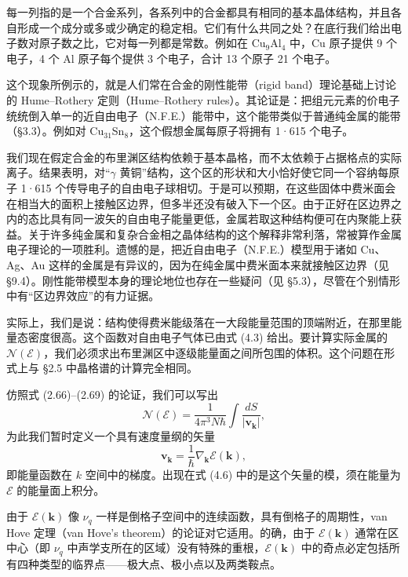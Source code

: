 每一列指的是一个合金系列，各系列中的合金都具有相同的基本晶体结构，并且各自形成一个成分或多或少确定的稳定相。它们有什么共同之处？在底行我们给出电子数对原子数之比，它对每一列都是常数。例如在 Cu$_9$Al$_4$ 中，Cu 原子提供 9 个电子，4 个 Al 原子每个提供 3 个电子，合计 13 个原子 21 个电子。

这个现象所例示的，就是人们常在合金的刚性能带（rigid band）理论基础上讨论的 Hume–Rothery 定则（Hume–Rothery rules）。其论证是：把组元元素的价电子统统倒入单一的近自由电子（N.F.E.）能带中，这个能带类似于普通纯金属的能带（§3.3）。例如对 Cu$_{31}$Sn$_{8}$，这个假想金属每原子将拥有 1·615 个电子。

我们现在假定合金的布里渊区结构依赖于基本晶格，而不太依赖于占据格点的实际离子。结果表明，对“$\gamma$ 黄铜”结构，这个区的形状和大小恰好使它同一个容纳每原子 1·615 个传导电子的自由电子球相切。于是可以预期，在这些固体中费米面会在相当大的面积上接触区边界，但多半还没有破入下一个区。由于正好在区边界之内的态比具有同一波矢的自由电子能量更低，金属若取这种结构便可在内聚能上获益。关于许多纯金属和复杂合金相之晶体结构的这个解释非常利落，常被算作金属电子理论的一项胜利。遗憾的是，把近自由电子（N.F.E.）模型用于诸如 Cu、Ag、Au 这样的金属是有异议的，因为在纯金属中费米面本来就接触区边界（见 §9.4）。刚性能带模型本身的理论地位也存在一些疑问（见 §5.3），尽管在个别情形中有“区边界效应”的有力证据。

实际上，我们是说：结构使得费米能级落在一大段能量范围的顶端附近，在那里能量态密度很高。这个函数对自由电子气体已由式 (4.3) 给出。要计算实际金属的 $\mathcal{N}(\mathcal{E})$，我们必须求出布里渊区中逐级能量面之间所包围的体积。这个问题在形式上与 §2.5 中晶格谱的计算完全相同。


仿照式 (2.66)–(2.69) 的论证，我们可以写出
\begin{equation*}
\mathcal{N}(\mathcal{E})=\frac{1}{4\pi^{3}N\hbar}\int\frac{dS}{|\mathbf{v}_{\mathbf{k}}|},
\tag{4.6}
\end{equation*}
为此我们暂时定义一个具有速度量纲的矢量
\begin{equation*}
\mathbf{v}_{\mathbf{k}}=\frac{1}{\hbar}\nabla_{\mathbf{k}}\mathcal{E}(\mathbf{k}),
\tag{4.7}
\end{equation*}
即能量函数在 $k$ 空间中的梯度。出现在式 (4.6) 中的是这个矢量的模，须在能量为 $\mathcal{E}$ 的能量面上积分。

由于 $\mathcal{E}(\mathbf{k})$ 像 $\nu_{q}$ 一样是倒格子空间中的连续函数，具有倒格子的周期性，van Hove 定理（van Hove's theorem）的论证对它适用。的确，由于 $\mathcal{E}(\mathbf{k})$ 通常在区中心（即 $\nu_{q}$ 中声学支所在的区域）没有特殊的重根，$\mathcal{E}(\mathbf{k})$ 中的奇点必定包括所有四种类型的临界点——极大点、极小点以及两类鞍点。

